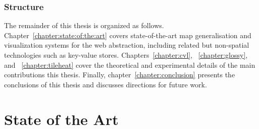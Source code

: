 \documentclass[11pt, oneside]{report}
\begin{document}
\section{Structure}
\label{sec:introduction:structure}


The remainder of this thesis is organized as follows. Chapter~\ref{chapter:state:of:the:art} covers state-of-the-art map generalisation and visualization systems for the web abstraction, including related but non-spatial technologies such as key-value stores. Chapters~\ref{chapter:cvl}, ~\ref{chapter:glossy}, and ~\ref{chapter:tileheat} cover the theoretical and experimental details of the main contributions this thesis. Finally, chapter~\ref{chapter:conclusion} presents the conclusions of this thesis and discusses directions for future work.






\part{State of the Art}

\end{document}
